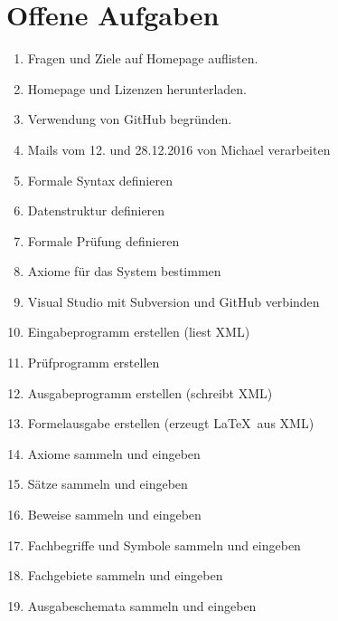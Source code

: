 \documentclass[english,ngerman,parskip=half,headsepline,footsepline]{scrreprt}
\begin{document}
	\section{Offene Aufgaben}
	\begin{enumerate}
		\item Fragen und Ziele auf Homepage auflisten.
		\item Homepage und Lizenzen herunterladen.
		\item Verwendung von GitHub begründen.
		\item Mails vom 12. und 28.12.2016 von Michael verarbeiten
		\item Formale Syntax definieren
		\item Datenstruktur definieren
		\item Formale Prüfung definieren
		\item Axiome für das System bestimmen
		\item Visual Studio mit Subversion und GitHub verbinden
		\item Eingabeprogramm erstellen (liest XML)
		\item Prüfprogramm erstellen
		\item Ausgabeprogramm erstellen (schreibt XML)
		\item Formelausgabe erstellen (erzeugt \LaTeX\ aus XML)
		\item Axiome sammeln und eingeben
		\item Sätze sammeln und eingeben
		\item Beweise sammeln und eingeben
		\item Fachbegriffe und Symbole sammeln und eingeben
		\item Fachgebiete sammeln und eingeben
		\item Ausgabeschemata sammeln und eingeben
	\end{enumerate}
		


	\listoftables {}
	\listoffigures{}
	\thispagestyle{scrheadings}
	
\end{document}
